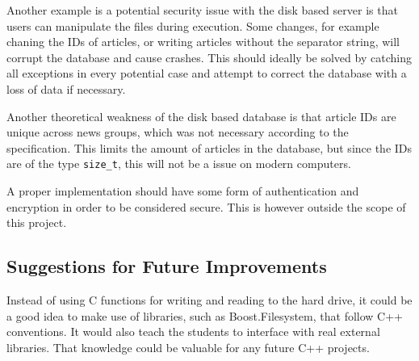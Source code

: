 \documentclass{acmsiggraph}               %
\begin{document}
Another example is a potential security issue with the disk based server
is that users can manipulate the files during execution. Some changes, for example 
chaning the IDs of articles, or writing articles without the separator string, will
corrupt the database and cause crashes. This should ideally be solved by catching
all exceptions in every potential case and attempt to correct the database with a
loss of data if necessary. 

Another theoretical weakness of the disk based database is that article IDs are unique
across news groups, which was not necessary according to the specification. This
limits the amount of articles in the database, but since the IDs are of
the type \texttt{size\_t}, this will not be a issue on modern computers.

A proper implementation should have some form of authentication and encryption 
in order to be considered secure. This is however outside the scope of this project.

\subsection{Suggestions for Future Improvements}
Instead of using C functions for writing and reading to the hard drive, it could
be a good idea to make use of libraries, such as Boost.Filesystem, that follow C++ 
conventions. It would also teach the students to interface with real external libraries. 
That knowledge could be valuable for any future C++ projects.
\end{document}
